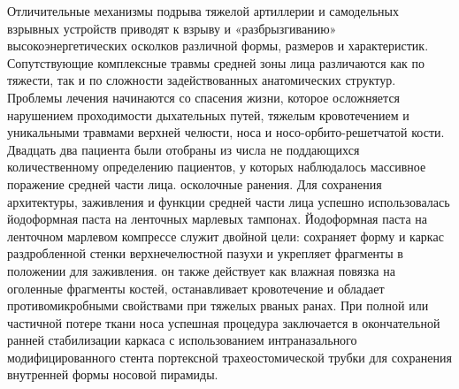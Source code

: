 Отличительные механизмы подрыва тяжелой артиллерии и самодельных взрывных
устройств приводят к взрыву и «разбрызгиванию» высокоэнергетических осколков
различной формы, размеров и характеристик. Сопутствующие комплексные травмы
средней зоны лица различаются как по тяжести, так и по сложности задействованных
анатомических структур. Проблемы лечения начинаются со спасения жизни, которое
осложняется нарушением проходимости дыхательных путей, тяжелым кровотечением и
уникальными травмами верхней челюсти, носа и носо-орбито-решетчатой кости.
Двадцать два пациента были отобраны из числа не поддающихся количественному
определению пациентов, у которых наблюдалось массивное поражение средней части
лица. осколочные ранения. Для сохранения архитектуры, заживления и функции
средней части лица успешно использовалась йодоформная паста на ленточных
марлевых тампонах. Йодоформная паста на ленточном марлевом компрессе служит
двойной цели: сохраняет форму и каркас раздробленной стенки верхнечелюстной
пазухи и укрепляет фрагменты в положении для заживления. он также действует как
влажная повязка на оголенные фрагменты костей, останавливает кровотечение и
обладает противомикробными свойствами при тяжелых рваных ранах. При полной или
частичной потере ткани носа успешная процедура заключается в окончательной
ранней стабилизации каркаса с использованием интраназального модифицированного
стента портексной трахеостомической трубки для сохранения внутренней формы
носовой пирамиды.\cite{27380580}

